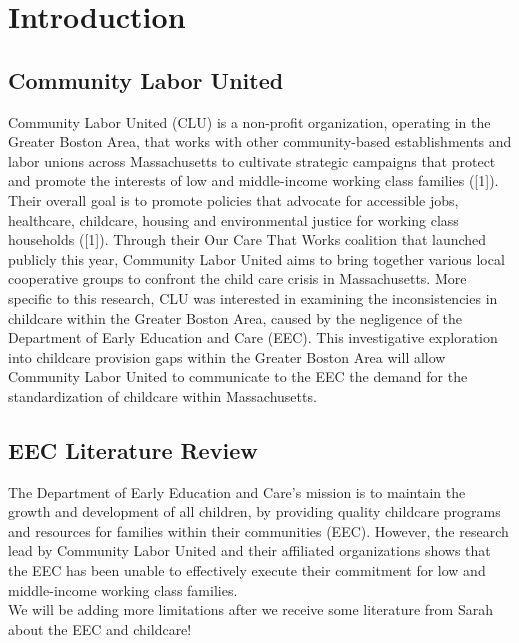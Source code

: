 \documentclass[10pt,letterpaper]{article}
\begin{document}
\linenumbers

\section{Introduction}\label{introduction}

\subsection{Community Labor United}\label{community-labor-united}

Community Labor United (CLU) is a non-profit organization, operating in
the Greater Boston Area, that works with other community-based
establishments and labor unions across Massachusetts to cultivate
strategic campaigns that protect and promote the interests of low and
middle-income working class families ({[}1{]}). Their overall goal is to
promote policies that advocate for accessible jobs, healthcare,
childcare, housing and environmental justice for working class
households ({[}1{]}). Through their Our Care That Works coalition that
launched publicly this year, Community Labor United aims to bring
together various local cooperative groups to confront the child care
crisis in Massachusetts. More specific to this research, CLU was
interested in examining the inconsistencies in childcare within the
Greater Boston Area, caused by the negligence of the Department of Early
Education and Care (EEC). This investigative exploration into childcare
provision gaps within the Greater Boston Area will allow Community Labor
United to communicate to the EEC the demand for the standardization of
childcare within Massachusetts.

\subsection{EEC Literature Review}\label{eec-literature-review}

The Department of Early Education and Care's mission is to maintain the
growth and development of all children, by providing quality childcare
programs and resources for families within their communities (EEC).
However, the research lead by Community Labor United and their
affiliated organizations shows that the EEC has been unable to
effectively execute their commitment for low and middle-income working
class families.\\
We will be adding more limitations after we receive some literature from
Sarah about the EEC and childcare!
\end{document}
